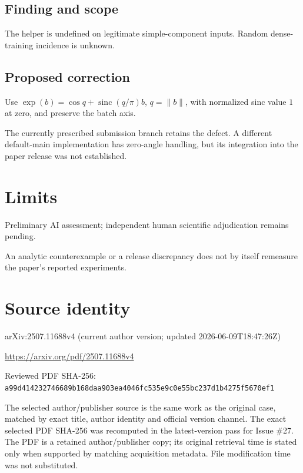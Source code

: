 \documentclass[11pt]{article}
\begin{document}
\subsection*{Finding and scope}

The helper is undefined on legitimate simple-component inputs. Random dense-training incidence is unknown.

\subsection*{Proposed correction}

Use \(\exp(b)=\cos q+\operatorname{sinc}(q/\pi)b\), \(q=\|b\|\), with normalized sinc value \(1\) at zero, and preserve the batch axis.

The currently prescribed submission branch retains the defect. A different default-main implementation has zero-angle handling, but its integration into the paper release was not established.

\section*{Limits}

Preliminary AI assessment; independent human scientific adjudication remains pending.\par

An analytic counterexample or a release discrepancy does not by itself remeasure the paper’s reported experiments.\par

\section*{Source identity}

arXiv:2507.11688v4 (current author version; updated 2026-06-09T18:47:26Z)

\url{https://arxiv.org/pdf/2507.11688v4}

Reviewed PDF SHA-256: \nolinkurl{a99d414232746689b168daa903ea4046fc535e9c0e55bc237d1b4275f5670ef1}

The selected author/publisher source is the same work as the original case, matched by exact title, author identity and official version channel. The exact selected PDF SHA-256 was recomputed in the latest-version pass for Issue \#27. The PDF is a retained author/publisher copy; its original retrieval time is stated only when supported by matching acquisition metadata. File modification time was not substituted.
\end{document}
